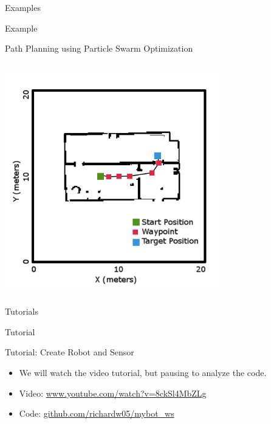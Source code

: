 \documentclass[9pt]{beamer}
\begin{document}
\begin{section}{Examples}
\begin{frame}{Example}
\begin{block}{Path Planning using Particle Swarm Optimization}
\begin{columns}
\begin{column}{0.5\textwidth}
                    \centering
                    \includegraphics[width=0.7\textwidth,trim={0cm 0cm 0cm 0cm},clip]{PSO_Setup1_Run1.png}
                \end{column}            
            \end{columns}
        \end{block}
    \end{frame}
\end{section}

\begin{section}{Tutorials}
    \begin{frame}{Tutorial}
        \begin{block}{Tutorial: Create Robot and Sensor}
            \begin{itemize}
                \item We will watch the video tutorial, but pausing to analyze the code. 
                \item Video: \url{www.youtube.com/watch?v=8ckSl4MbZLg}
                \item Code: \url{github.com/richardw05/mybot_ws}
            \end{itemize}
        \end{block}
    \end{frame}
\end{section}
\end{document}
